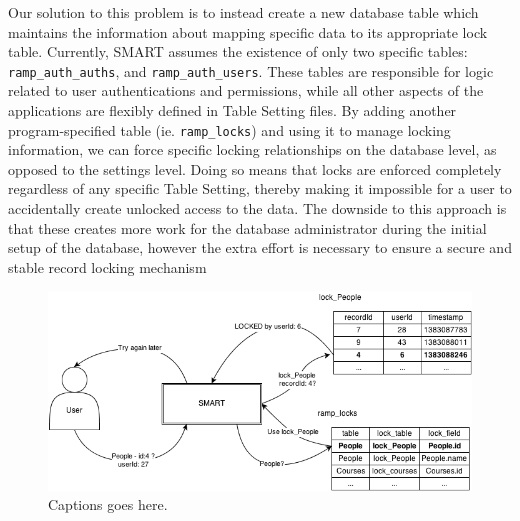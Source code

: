 \documentclass[12pt]{article}
\newcommand{\code}[1]{\texttt{#1}}
\begin{document}
Our solution to this problem is to instead create a new database table which maintains the information about mapping specific data to its appropriate lock table. Currently, SMART assumes the existence of only two specific tables: \code{ramp\_auth\_auths}, and \code{ramp\_auth\_users}. These tables are responsible for logic related to user authentications and permissions, while all other aspects of the applications are flexibly defined in Table Setting files. By adding another program-specified table (ie. \code{ramp\_locks}) and using it to manage locking information, we can force specific locking relationships on the database level, as opposed to the settings level. Doing so means that locks are enforced completely regardless of any specific Table Setting, thereby making it impossible for a user to accidentally create unlocked access to the data. The downside to this approach is that these creates more work for the database administrator during the initial setup of the database, however the extra effort is necessary to ensure a secure and stable record locking mechanism

\begin{center}
\begin{figure}[h]
    \centering
    \centerline{\includegraphics[width=7in]{diagrams/SecondLockDesign.png}}
    \begin{spacing}{1.0}\caption{Captions goes here.}\end{spacing}
\end{figure}
\end{center}
\end{document}
